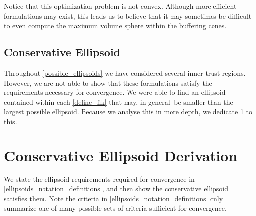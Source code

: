 Notice that this optimization problem is not convex.
Although more efficient formulations may exist, this leads us to believe that it may sometimes be difficult to even compute the maximum volume sphere within the buffering cones.

\subsection{Conservative Ellipsoid}
Throughout \cref{possible_ellipsoids} we have considered several inner trust regions.
However, we are not able to show that these formulations satisfy the requirements necessary for convergence.  
We were able to find an ellipsoid contained within each \cref{define_fik} that may, in general, be smaller than the largest possible ellipsoid.
Because we analyse this in more depth, we dedicate \cref{constructing_and_analysizing_conservative_ellipsoid} to this.

\section{Conservative Ellipsoid Derivation}
\label{constructing_and_analysizing_conservative_ellipsoid}

We state the ellipsoid requirements required for convergence in \cref{ellipsoids_notation_definitions}, and then show the conservative ellipsoid satisfies them.
Note the criteria in \cref{ellipsoids_notation_definitions} only summarize one of many possible sets of criteria sufficient for convergence.


